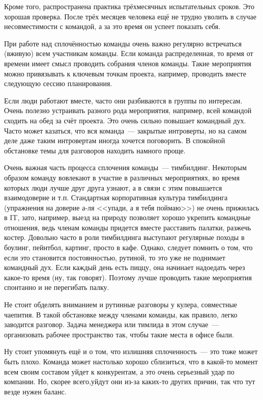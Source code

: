 \documentclass{../../text-style}
\begin{document}
Кроме того, распространена практика трёхмесячных испытательных сроков. Это хорошая проверка. После трёх месяцев человека ещё не трудно уволить в случае несовместимости с командой, а за это время он успеет показать себя.

При работе над сплочённостью команды очень важно регулярно встречаться (вживую) всем участникам команды. Если команда распределенная, то время от времени имеет смысл проводить собрания членов команды. Такие мероприятия можно привязывать к ключевым точкам проекта, например, проводить вместе следующую сессию планирования.

Если люди работают вместе, часто они разбиваются в группы по интересам. Очень полезно устраивать разного рода мероприятия, например, всей командой сходить на обед за счёт проекта. Это очень сильно повышает командный дух. Часто может казаться, что вся команда~--- закрытые интроверты, но на самом деле даже таким интровертам иногда хочется поговорить. В спокойной обстановке темы для разговоров находить намного проще.

Очень важная часть процесса сплочения команды~--- тимбилдинг. Некоторым образом команду вовлекают в участие в различных мероприятиях, во время которых люди лучше друг друга узнают, а в связи с этим повышается взаимодоверие и т.п. Стандартная корпоративная культура тимбилдинга (упражнения на доверие а-ля <<упади, а я тебя поймаю>>) не очень прижилась в IT, зато, например, выезд на природу позволяет хорошо укрепить командные отношения, ведь членам команды придется вместе расставить палатки, разжечь костер. Довольно часто в роли тимбилдинга выступают регулярные походы в боулинг, пейнтбол, картинг, просто в кафе. Однако, следует помнить о том, что если это становится постоянностью, рутиной, то это уже не поднимает командный дух. Если каждый день есть пиццу, она начинает надоедать через какое-то время (ну, так говорят). Поэтому лучше проводить такие мероприятия спонтанно и не перегибать палку.

Не стоит обделять вниманием и рутинные разговоры у кулера, совместные чаепития. В такой обстановке между членами команды, как правило, легко заводится разговор. Задача менеджера или тимлида в этом случае~--- организовать рабочее пространство так, чтобы такие места в офисе были.

Ну стоит упомянуть ещё и о том, что излишняя сплоченность~--- это тоже может быть плохо. Команда может настолько хорошо сблизиться, что в какой-то момент всем своим составом уйдет к конкурентам, а это очень серьезный удар по компании. Но, скорее всего,уйдут они из-за каких-то других причин, так что тут везде нужен баланс.
\end{document}
